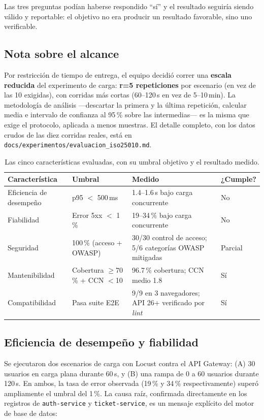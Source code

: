 Las tres preguntas podían haberse respondido \enquote{sí} y el resultado seguiría siendo válido y
reportable: el objetivo no era producir un resultado favorable, sino uno verificable.

\subsection{Nota sobre el alcance}

Por restricción de tiempo de entrega, el equipo decidió correr una \textbf{escala reducida} del
experimento de carga: \textbf{r=5 repeticiones} por escenario (en vez de las 10 exigidas), con
corridas más cortas (60--120\,s en vez de 5--10\,min). La metodología de análisis —descartar la
primera y la última repetición, calcular media e intervalo de confianza al 95\,\% sobre las
intermedias— es la misma que exige el protocolo, aplicada a menos muestras. El detalle completo,
con los datos crudos de las diez corridas reales, está en
\texttt{docs/experimentos/evaluacion\_iso25010.md}.

\begin{table}[H]
\centering
\small
\caption{Las cinco características evaluadas, con su umbral objetivo y el resultado medido.}
\label{tab:iso-umbrales}
\begin{tabular}{@{}p{2.9cm}p{3.1cm}p{4.6cm}p{1.3cm}@{}}
\toprule
\textbf{Característica} & \textbf{Umbral} & \textbf{Medido} & \textbf{¿Cumple?} \\
\midrule
Eficiencia de desempeño & p95 $<$ 500\,ms & 1.4--1.6\,s bajo carga concurrente & No \\
Fiabilidad & Error 5xx $<$ 1\,\% & 19--34\,\% bajo carga concurrente & No \\
Seguridad & 100\,\% (acceso + OWASP) & 30/30 control de acceso; 5/6 categorías OWASP mitigadas & Parcial \\
Mantenibilidad & Cobertura $\geq$70\,\% + CCN $<$10 & 96.7\,\% cobertura; CCN medio 1.8 & Sí \\
Compatibilidad & Pasa suite E2E & 9/9 en 3 navegadores; API 26+ verificado por \emph{lint} & Sí \\
\bottomrule
\end{tabular}
\end{table}

\subsection{Eficiencia de desempeño y fiabilidad}

Se ejecutaron dos escenarios de carga con Locust contra el API Gateway: (A) 30 usuarios en carga
plana durante 60\,s, y (B) una rampa de 0 a 60 usuarios durante 120\,s. En ambos, la tasa de
error observada (19\,\% y 34\,\% respectivamente) superó ampliamente el umbral del 1\,\%. La
causa raíz, confirmada directamente en los registros de \texttt{auth-service} y
\texttt{ticket-service}, es un mensaje explícito del motor de base de datos:

